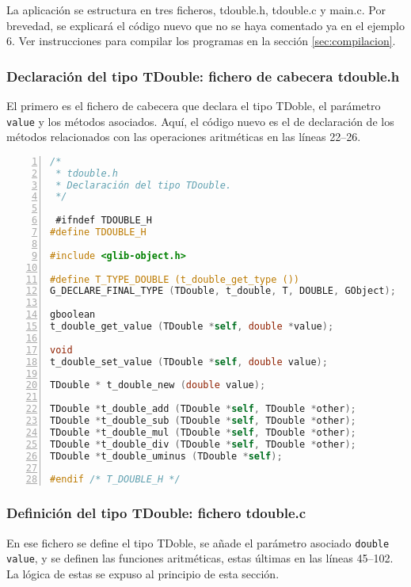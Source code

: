 La aplicación se estructura en tres ficheros, \textsf{tdouble.h}, \textsf{tdouble.c} y \textsf{main.c}.
Por brevedad, se explicará el código nuevo que no se haya comentado ya en el ejemplo 6.
Ver instrucciones para compilar los programas en la sección \ref{sec:compilacion}.

\subsubsection{Declaración del tipo \textsf{TDouble}: fichero de cabecera \textsf{tdouble.h}}
El primero es el fichero de cabecera que declara el tipo \textsf{TDoble}, el parámetro \texttt{value} y
los métodos asociados. Aquí, el código nuevo es el de declaración de los métodos relacionados con las
operaciones aritméticas en las líneas 22--26.

\begin{lstlisting}[language=C, numbers=left]
/*
 * tdouble.h
 * Declaración del tipo TDouble.
 */

 #ifndef TDOUBLE_H
#define TDOUBLE_H

#include <glib-object.h>

#define T_TYPE_DOUBLE (t_double_get_type ())
G_DECLARE_FINAL_TYPE (TDouble, t_double, T, DOUBLE, GObject);

gboolean
t_double_get_value (TDouble *self, double *value);

void
t_double_set_value (TDouble *self, double value);

TDouble * t_double_new (double value);

TDouble *t_double_add (TDouble *self, TDouble *other);
TDouble *t_double_sub (TDouble *self, TDouble *other);
TDouble *t_double_mul (TDouble *self, TDouble *other);
TDouble *t_double_div (TDouble *self, TDouble *other);
TDouble *t_double_uminus (TDouble *self);

#endif /* T_DOUBLE_H */
\end{lstlisting}

\subsubsection{Definición del tipo \textsf{TDouble}: fichero \textsf{tdouble.c}}
En ese fichero se define el tipo \textsf{TDoble}, se añade el parámetro asociado \texttt{double value},
y se definen las funciones aritméticas, estas últimas en las líneas 45--102. La lógica de estas se expuso al
principio de esta sección.

